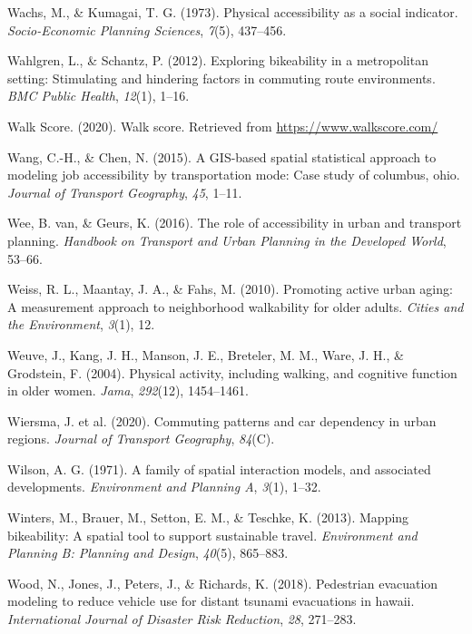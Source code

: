\documentclass[
11pt, %
oneside, %
english, %
singlespacing, %
]{macthesis} %
\newlength{\cslhangindent}
\newenvironment{CSLReferences}[2] %
{\begin{list}{}{%
	\setlength{\itemindent}{0pt}
	\setlength{\leftmargin}{0pt}
	\setlength{\parsep}{0pt}
	\ifodd #1
	\setlength{\leftmargin}{\cslhangindent}
	\setlength{\itemindent}{-1\cslhangindent}
	\fi
	\setlength{\itemsep}{#2\baselineskip}}}
{\end{list}}
\begin{document}
\begin{CSLReferences}{1}{0}
Wachs, M., \& Kumagai, T. G. (1973). Physical accessibility as a social indicator. \emph{Socio-Economic Planning Sciences}, \emph{7}(5), 437--456.

Wahlgren, L., \& Schantz, P. (2012). Exploring bikeability in a metropolitan setting: Stimulating and hindering factors in commuting route environments. \emph{BMC Public Health}, \emph{12}(1), 1--16.

Walk Score. (2020). Walk score. Retrieved from \url{https://www.walkscore.com/}

Wang, C.-H., \& Chen, N. (2015). A GIS-based spatial statistical approach to modeling job accessibility by transportation mode: Case study of columbus, ohio. \emph{Journal of Transport Geography}, \emph{45}, 1--11.

Wee, B. van, \& Geurs, K. (2016). The role of accessibility in urban and transport planning. \emph{Handbook on Transport and Urban Planning in the Developed World}, 53--66.

Weiss, R. L., Maantay, J. A., \& Fahs, M. (2010). Promoting active urban aging: A measurement approach to neighborhood walkability for older adults. \emph{Cities and the Environment}, \emph{3}(1), 12.

Weuve, J., Kang, J. H., Manson, J. E., Breteler, M. M., Ware, J. H., \& Grodstein, F. (2004). Physical activity, including walking, and cognitive function in older women. \emph{Jama}, \emph{292}(12), 1454--1461.

Wiersma, J. et al. (2020). Commuting patterns and car dependency in urban regions. \emph{Journal of Transport Geography}, \emph{84}(C).

Wilson, A. G. (1971). A family of spatial interaction models, and associated developments. \emph{Environment and Planning A}, \emph{3}(1), 1--32.

Winters, M., Brauer, M., Setton, E. M., \& Teschke, K. (2013). Mapping bikeability: A spatial tool to support sustainable travel. \emph{Environment and Planning B: Planning and Design}, \emph{40}(5), 865--883.

Wood, N., Jones, J., Peters, J., \& Richards, K. (2018). Pedestrian evacuation modeling to reduce vehicle use for distant tsunami evacuations in hawaii. \emph{International Journal of Disaster Risk Reduction}, \emph{28}, 271--283.


\end{CSLReferences}
\end{document}
